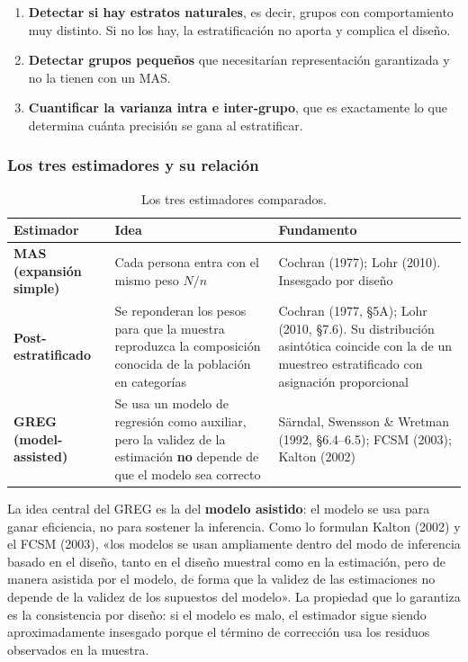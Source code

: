 \begin{enumerate}
  \item \textbf{Detectar si hay estratos naturales}, es decir, grupos con
        comportamiento muy distinto. Si no los hay, la estratificación no aporta
        y complica el diseño.
  \item \textbf{Detectar grupos pequeños} que necesitarían representación
        garantizada y no la tienen con un MAS.
  \item \textbf{Cuantificar la varianza intra e inter-grupo}, que es exactamente
        lo que determina cuánta precisión se gana al estratificar.
\end{enumerate}

\subsubsection{Los tres estimadores y su relación}

\begin{table}[H]
  \centering
  \small
  \caption{Los tres estimadores comparados.}
  \label{tab:mues-estimadores}
  \begin{tabular}{@{}p{3.1cm}p{5.3cm}p{6.6cm}@{}}
    \toprule
    \textbf{Estimador} & \textbf{Idea} & \textbf{Fundamento} \\
    \midrule
    \textbf{MAS (expansión simple)} & Cada persona entra con el mismo peso
      $N/n$ & Cochran (1977); Lohr (2010). Insesgado por diseño \\
    \textbf{Post-estratificado} & Se reponderan los pesos para que la muestra
      reproduzca la composición conocida de la población en categorías &
      Cochran (1977, §5A); Lohr (2010, §7.6). Su distribución asintótica
      coincide con la de un muestreo estratificado con asignación proporcional \\
    \textbf{GREG (model-assisted)} & Se usa un modelo de regresión como
      auxiliar, pero la validez de la estimación \textbf{no} depende de que el
      modelo sea correcto & Särndal, Swensson \& Wretman (1992, §6.4--6.5);
      FCSM (2003); Kalton (2002) \\
    \bottomrule
  \end{tabular}
\end{table}

La idea central del GREG es la del \textbf{modelo asistido}: el modelo se usa
para ganar eficiencia, no para sostener la inferencia. Como lo formulan Kalton
(2002) y el FCSM (2003), «los modelos se usan ampliamente dentro del modo de
inferencia basado en el diseño, tanto en el diseño muestral como en la
estimación, pero de manera asistida por el modelo, de forma que la validez de
las estimaciones no depende de la validez de los supuestos del modelo». La
propiedad que lo garantiza es la consistencia por diseño: si el modelo es malo,
el estimador sigue siendo aproximadamente insesgado porque el término de
corrección usa los residuos observados en la muestra.

